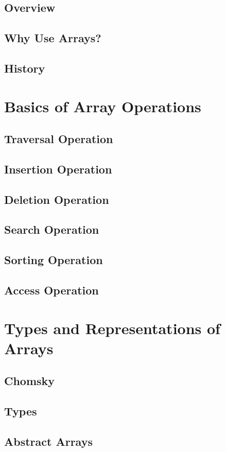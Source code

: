 \documentclass[12pt, oneside]{book}
\begin{document}
	\section{Overview}
	\section{Why Use Arrays?}
	\section{History}
	\chapter{Basics of Array Operations}
	\section{Traversal Operation}
	\section{Insertion Operation}
	\section{Deletion Operation}
	\section{Search Operation}
	\section{Sorting Operation}
	\section{Access Operation}
	\chapter{Types and Representations of Arrays}
	\section{Chomsky}
	\section{Types}
	\section{Abstract Arrays}
\end{document}
